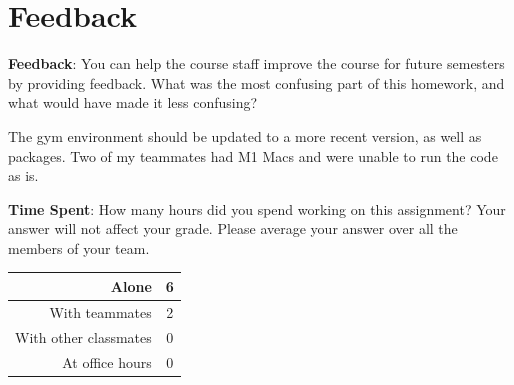 \documentclass[12pt]{article}
\begin{document}

\clearpage
\section*{Feedback}

\textbf{Feedback}: You can help the course staff improve the course for future semesters by providing feedback. What was the most confusing part of this homework, and what would have made it less confusing?
\begin{solution}[height=4cm]
    The gym environment should be updated to a more recent version, as well as packages. Two of my teammates had M1 Macs and were unable to run the code as is. 
\end{solution}

\noindent\textbf{Time Spent}: How many hours did you spend working on this assignment? Your answer will not affect your grade. Please average your answer over all the members of your team.
\begin{table}[H]
    \centering
    \begin{tabular}{r|c}
        Alone &  \hspace{3em} 6
        \\ \hline
        With teammates & \hspace{3em} 2
        \\ \hline
        With other classmates & \hspace{3em} 0
        \\ \hline
        At office hours & \hspace{3em} 0
        \\ \hline
    \end{tabular}
\end{table}
\end{document}
